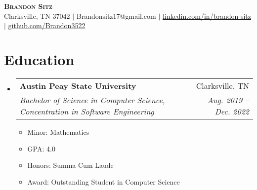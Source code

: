 \documentclass[letterpaper,11pt]{article}
\makeatletter
\newcommand{\resumeItem}[1]{
  \item\small{
    {#1 \vspace{-2pt}}
  }
}
\newcommand{\resumeSubheading}[4]{
  \vspace{-2pt}\item
    \begin{tabular*}{0.97\textwidth}[t]{l@{\extracolsep{\fill}}r}
      \textbf{#1} & #2 \\
      \textit{\small#3} & \textit{\small #4} \\
    \end{tabular*}\vspace{-7pt}
}
\newcommand{\resumeSubHeadingListStart}{\begin{itemize}[leftmargin=0.15in, label={}]}
\newcommand{\resumeSubHeadingListEnd}{\end{itemize}}
\newcommand{\resumeItemListStart}{\begin{itemize}}
\newcommand{\resumeItemListEnd}{\end{itemize}\vspace{-5pt}}
\makeatother
\begin{document}

\begin{center}
    \textbf{\Huge \scshape Brandon Sitz} \\ \vspace{1pt}
		{Clarksville, TN 37042} $|$
		{Brandonsitz17@gmail.com} $|$ 
    \href{https://linkedin.com/in/brandon-sitz}{linkedin.com/in/brandon-sitz} $|$
    \href{https://github.com/Brandon3522}{github.com/Brandon3522}
\end{center}


\section{Education}
  \resumeSubHeadingListStart
    \resumeSubheading
      {Austin Peay State University}{Clarksville, TN}
      {Bachelor of Science in Computer Science, Concentration in Software Engineering}{Aug. 2019 -- Dec. 2022}
			\resumeItemListStart
				\resumeItem{Minor: Mathematics}
        \resumeItem{GPA: 4.0}
        \resumeItem{Honors: Summa Cum Laude}
        \resumeItem{Award: Outstanding Student in Computer Science}
      \resumeItemListEnd
  \resumeSubHeadingListEnd


	
\end{document}
